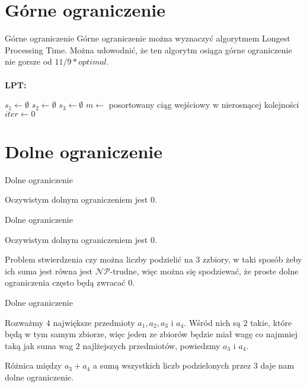 \documentclass{beamer}
\begin{document}
\section{Górne ograniczenie}

\begin{frame}{Górne ograniczenie}
Górne ograniczenie można wyznaczyć algorytmem Longest Processing Time. Można udowodnić, że ten algorytm osiąga górne ograniczenie nie gorsze od $11/9*optimal$.\\~\\
\textbf{LPT:}\\
\begin{algorithm}[H]
 $s_1 \gets \emptyset$\;
 $s_2 \gets \emptyset$\;
 $s_3 \gets \emptyset$\;
 $m \gets $ posortowany ciąg wejściowy w nierosnącej kolejności\;
 $iter \gets 0$\;
\end{algorithm} 

  

\end{frame}

\section{Dolne ograniczenie}

\begin{frame}[t]{Dolne ograniczenie}

Oczywistym dolnym ograniczeniem jest $0$.

\end{frame}

\begin{frame}[t]{Dolne ograniczenie}

Oczywistym dolnym ograniczeniem jest $0$.

Problem stwierdzenia czy można liczby podzielić na $3$ zzbiory, w taki sposób żeby ich suma jest równa jest $\mathcal{NP}$-trudne, więc można się spodziewać, że proste dolne ograniczenia często będą zwracać $0$.

\end{frame}

\begin{frame}[t]{Dolne ograniczenie}

Rozważmy $4$ największe przedmioty $a_1, a_2, a_3$ i $a_4$. Wśród nich są $2$ takie, które będą w tym samym zbiorze, więc jeden ze zbiorów będzie miał wagę co najmniej taką jak suma wag $2$ najlżejszych przedmiotów, powiedzmy $a_3$ i $a_4$.

Różnica między $a_3+a_4$ a sumą wszystkich liczb podzielonych przez $3$ daje nam dolne ograniczenie.

\end{frame}
\end{document}
